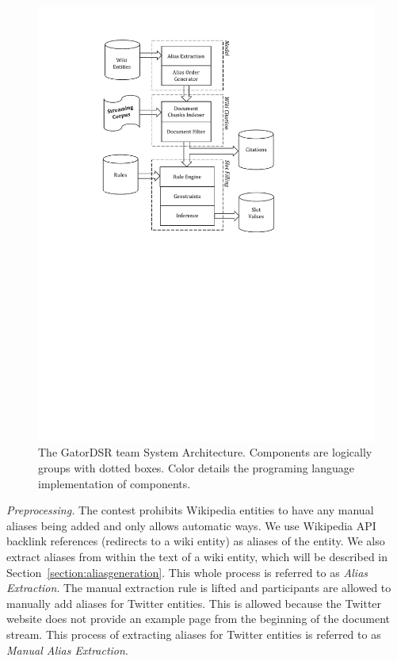 \begin{figure}
  \centering
  \includegraphics[width=6in]{./images/System_Diagram_with_model_Vertical.pdf}
  \vspace*{-.1in} 
  \caption{The GatorDSR team System Architecture.
  Components are logically groups with dotted boxes.
  Color details the programing language implementation of components.}
  \label{fig:system}
  \vspace*{-.2in}
\end{figure}



\textit{Preprocessing.}
The contest prohibits Wikipedia entities to have any manual aliases being added and only allows automatic ways. We use Wikipedia API backlink references (redirects to a wiki entity) as aliases of the entity. We also extract aliases from within the text of a wiki entity, which will be described in Section~\ref{section:aliasgeneration}. This whole process is referred to as \textit{Alias Extraction}. The manual extraction rule is lifted and participants are allowed to manually add aliases for Twitter entities. This is allowed because the Twitter website does not provide an example page from the beginning of the document stream. This process of extracting aliases for Twitter entities is referred to as \textit{Manual Alias Extraction}.

